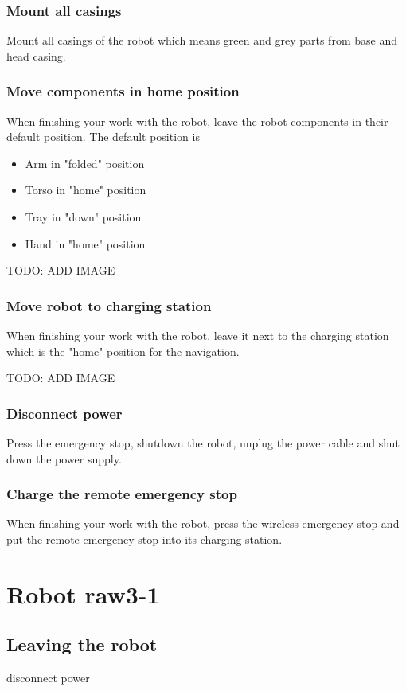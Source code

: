 \subsubsection{Mount all casings}
Mount all casings of the robot which means green and grey parts from base and head casing.

\subsubsection{Move components in home position}
When finishing your work with the robot, leave the robot components in their default position. The default position is
\begin{itemize}
\item Arm in "folded" position
\item Torso in "home" position
\item Tray in "down" position
\item Hand in "home" position
\end{itemize}

TODO: ADD IMAGE

\subsubsection{Move robot to charging station}
When finishing your work with the robot, leave it next to the charging station which is the "home" position for the navigation.

TODO: ADD IMAGE

\subsubsection{Disconnect power}
Press the emergency stop, shutdown the robot, unplug the power cable and shut down the power supply.

\subsubsection{Charge the remote emergency stop}
When finishing your work with the robot, press the wireless emergency stop and put the remote emergency stop into its charging station.

\section{Robot raw3-1}

\subsection{Leaving the robot}

disconnect power